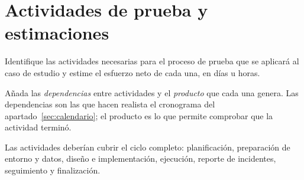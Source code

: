\section{Actividades de prueba y estimaciones}
\label{sec:actividades}

\begin{instruccion}
Identifique las actividades necesarias para el proceso de prueba que se aplicará al caso de
estudio y estime el esfuerzo neto de cada una, en días u horas.

Añada las \emph{dependencias} entre actividades y el \emph{producto} que cada una genera. Las
dependencias son las que hacen realista el cronograma del apartado~\ref{sec:calendario}; el
producto es lo que permite comprobar que la actividad terminó.

Las actividades deberían cubrir el ciclo completo: planificación, preparación de entorno y
datos, diseño e implementación, ejecución, reporte de incidentes, seguimiento y finalización.
\end{instruccion}

